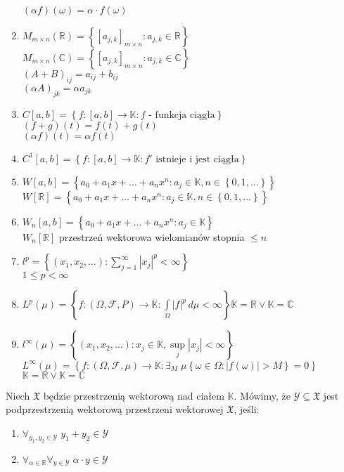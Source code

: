 \begin{enumerate}[1)]
$ (\alpha f)(\omega)=\alpha\cdot f(\omega) $
\item
$ M_{m\times n}(\mathbb R )=\left\{[a_{j,k}]_{m\times n}:a_{j,k}\in \mathbb R \right\} $\\
$ M_{m\times n}(\mathbb C )=\left\{[a_{j,k}]_{m\times n}:a_{j,k}\in \mathbb C \right\} $\\
$ (A+B)_{ij}=a_{ij}+b_{ij} $\\
$ (\alpha A)_{jk}=\alpha a_{jk} $
\item $ C[a,b]=\left\{f:[a,b]\to\mathbb K:f\text{ - funkcja ciągła}\right\} $\\
$ (f+g)(t)=f(t)+g(t) $\\
$ (\alpha f)(t)=\alpha f(t) $
\item $ C^1[a,b]=\left\{f:[a,b]\to\mathbb K:f'\text{ istnieje i jest ciągła}\right\} $
\item 
$ W[a,b]=\left\{a_0+a_1x+\dots+a_nx^n:a_j\in \mathbb K,n\in \left\{0,1,\dots \right\}\right\} $\\
$ W[\mathbb R ]=\left\{a_0+a_1x+\dots+a_nx^n:a_j\in \mathbb K,n\in \left\{0,1,\dots \right\}\right\} $
\item $ W_n[a,b]=\left\{a_0+a_1x+\dots+a_nx^n:a_j\in \mathbb K\right\} $\\
$ W_n[\mathbb R ] $ przestrzeń wektorowa wielomianów stopnia $ \le n $
\item $ l^p=\left\{\left(x_1,x_2,\dots\right):\sum_{j=1}^{\infty }\left|x_j\right|^p<\infty \right\} $\\
$ 1\le p<\infty  $
\item $ L^p(\mu)=\left\{f:(\Omega,\mathcal F,P)\to \mathbb K:\int\limits_{\Omega}\left|f\right|^p\,d\mu<\infty \right\} $\qquad$ \mathbb K=\mathbb R \vee\mathbb K=\mathbb C $
\item $ l^\infty (\mu)=\left\{(x_1,x_2,\dots):x_j\in \mathbb K,\sup\limits_j\left|x_j\right|<\infty \right\} $\\
$ L^\infty (\mu)=\left\{f:(\Omega,\mathcal F,\mu)\to \mathbb K:\exists_M\;\mu\left\{\omega\in\Omega:\left|f(\omega)\right|>M\right\}=0\right\} $\qquad$ \mathbb K=\mathbb R \vee\mathbb K=\mathbb C $
\end{enumerate}
  \begin{defi}
Niech $ \mathfrak X $ będzie przestrzenią wektorową nad ciałem $ \mathbb K $. Mówimy, że $ \mathcal Y\subseteq \mathfrak X $ jest podprzestrzenią wektorową przestrzeni wektorowej $ \mathfrak X $, jeśli:
\begin{enumerate}
\item $ \forall_{y_1,y_2\in\mathcal Y}\;y_1+y_2\in\mathcal Y $
\item $ \forall_{\alpha\in\mathbb R}\forall_{y\in\mathcal Y}\;\alpha\cdot y\in \mathcal Y $
\end{enumerate}
\end{defi}
